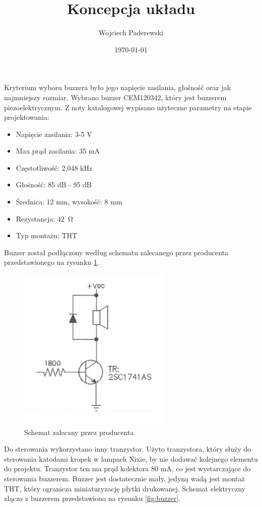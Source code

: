\documentclass[../../main.tex]{subfiles}
\author{Wojciech Paderewski}
\date{\today}
\title{Koncepcja układu}
\begin{document}
Kryterium wyboru buzzera było jego napięcie zasilania, głośność oraz jak najmniejszy rozmiar.
Wybrano buzzer CEM120342, który jest buzzerem piezoelektrycznym. Z noty katalogowej \cite{st:buzzer} wypisano użyteczne parametry na etapie projektowania:

\begin{itemize}
    \item Napięcie zasilania: 3-5 V
    \item Max prąd zasilania: 35 mA
    \item Częstotliwość: 2,048 kHz
    \item Głośność: 85 dB - 95 dB
    \item Średnica: 12 mm, wysokość: 8 mm
    \item Rezystancja: \SI{42}{\ohm}
    \item Typ montażu: THT
\end{itemize}

Buzzer został podłączony według schematu zalecanego przez producenta przedstawionego na rysunku \ref{fig:buzzer_karta}.
\begin{figure}[H]
    \centering
    \includegraphics[width=0.65\textwidth]{buzzer_karta.png}
    \caption{Schemat zalecany przez producenta \cite{st:buzzer}}
    \label{fig:buzzer_karta}
\end{figure}

Do sterowania wykorzystano inny tranzystor. Użyto tranzystora, który służy do sterowania katodami kropek w lampach Nixie, by nie dodawać kolejnego elementu do projektu.
Tranzystor ten ma prąd kolektora 80 mA, co jest wystarczające do sterowania buzzerem.
Buzzer jest dostatecznie mały, jedyną wadą jest montaż THT, który ogranicza miniaturyzację płytki drukowanej.
Schemat elektryczny złącza z buzzerem przedstawiono na rysunku \ref{fig:buzzer}.
\end{document}
